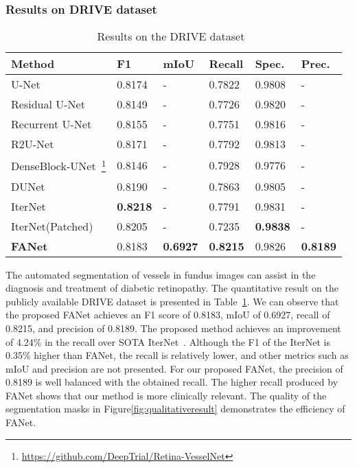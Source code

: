 \documentclass[journal]{IEEEtran}
\begin{document}
\subsubsection{Results on DRIVE dataset}
\begin{table}[!t]
\footnotesize
\centering
\caption{Results on the DRIVE dataset~\cite{staal2004ridge}}
\vspace{0.1cm}
\begin{tabular}{@{}l|l|l|l|l|l@{}}
\toprule
\textbf{Method} & \textbf{F1} & \textbf{mIoU} & \textbf{Recall}& \textbf{Spec.} & \textbf{Prec.} \\ 
\hline
\hline
U-Net~\cite{ronneberger2015u} & 0.8174 & - & 0.7822 & 0.9808 & - \\ Residual U-Net~\cite{alom2018recurrent} & 0.8149 & - & 0.7726 & 0.9820 & - \\ Recurrent U-Net~\cite{alom2018recurrent}  & 0.8155 & - & 0.7751 & 0.9816 & - \\ R2U-Net~\cite{alom2018recurrent} &0.8171 & - &0.7792 &0.9813 & - \\ DenseBlock-UNet~\footnote{\url{https://github.com/DeepTrial/Retina-VesselNet}} &0.8146 & - &0.7928 &0.9776 & - \\ DUNet~\cite{jin2019dunet} & 0.8190 & - &0.7863 &0.9805 & - \\ IterNet~\cite{li2020iternet} &\textbf{0.8218} &- &0.7791 &0.9831 & -  \\ IterNet(Patched)~\cite{li2020iternet} &0.8205 &-  &0.7235 & \textbf{0.9838} &- \\ \textbf{FANet} &0.8183 & \textbf{0.6927} & \textbf{0.8215} &0.9826 & \textbf{0.8189} \\ \bottomrule
\end{tabular}
\label{tab:Drivedataset}
\end{table}

The automated segmentation of vessels in fundus images can assist in the diagnosis and treatment of diabetic retinopathy. The quantitative result on the publicly available DRIVE dataset is presented in Table~\ref{tab:Drivedataset}. We can observe that the proposed FANet achieves an F1 score of 0.8183, \ac{mIoU} of 0.6927, recall of 0.8215, and precision of 0.8189. The proposed method achieves an improvement of 4.24\% in the recall over \ac{SOTA} IterNet~\cite{li2020iternet}. Although the F1 of the IterNet is 0.35\% higher than FANet, the recall is relatively lower, and other metrics such as \ac{mIoU} and precision are not presented. For our proposed FANet, the precision of 0.8189 is well balanced with the obtained recall. The higher recall produced by FANet shows that our method is more clinically relevant. The quality of the segmentation masks in Figure\ref{fig:qualitativeresult} demonstrates the efficiency of FANet. 
\end{document}
